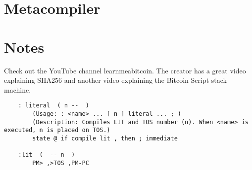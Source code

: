 %
\section{Metacompiler}


%
\section{Notes}
Check out the YouTube channel learnmeabitcoin. The creator has a great video explaining SHA256
and another video explaining the Bitcoin Script stack machine.



\begin{table}[htbp]
    \caption{Example interpretation of a Forth word. This table would be paired with a
    code listing for the word. A column can be added for the return stack or other information. 
    Exercises can be made in the style of fill-in-the-missing-item.}
    \label{tab:addlabel}%
\end{table}%

\begin{lstlisting}
    : literal  ( n --  )
        (Usage: : <name> ... [ n ] literal ... ; )
        (Description: Compiles LIT and TOS number (n). When <name> is executed, n is placed on TOS.)
        state @ if compile lit , then ; immediate

    :lit  (  -- n  )
        PM> ,>TOS ,PM-PC

\end{lstlisting}



